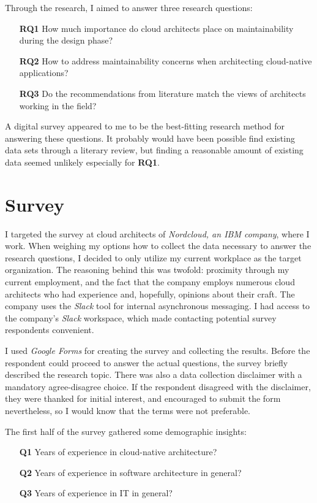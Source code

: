 \documentclass[utf8,english]{gradu3}
\begin{document}
Through the research, I aimed to answer three research questions:
\begin{itemize}
  \item [\textbf{RQ1}] How much importance do cloud architects place on
        maintainability during the design phase?
  \item [\textbf{RQ2}] How to address maintainability concerns when architecting
        cloud-native applications?
  \item [\textbf{RQ3}] Do the recommendations from literature match the views of
        architects working in the field?
\end{itemize}

A digital survey appeared to me to be the best-fitting research method for
answering these questions.  It probably would have been possible find existing
data sets through a literary review, but finding a reasonable amount of existing
data seemed unlikely especially for \textbf{RQ1}.

\section{Survey}

I targeted the survey at cloud architects of \textit{Nordcloud, an IBM company},
where I work.  When weighing my options how to collect the data necessary to
answer the research questions, I decided to only utilize my current workplace as
the target organization.  The reasoning behind this was twofold: proximity
through my current employment, and the fact that the company employs numerous
cloud architects who had experience and, hopefully, opinions about their craft.
The company uses the \textit{Slack} tool for internal asynchronous messaging.  I
had access to the company's \textit{Slack} workspace, which made contacting
potential survey respondents convenient.

I used \textit{Google Forms} for creating the survey and collecting the results.
Before the respondent could proceed to answer the actual questions, the survey
briefly described the research topic.  There was also a data collection
disclaimer with a mandatory agree-disagree choice.  If the respondent disagreed
with the disclaimer, they were thanked for initial interest, and encouraged to
submit the form nevertheless, so I would know that the terms were not
preferable.

The first half of the survey gathered some demographic insights:
\begin{enumerate}
  \item [\textbf{Q1}] Years of experience in cloud-native architecture?
  \item [\textbf{Q2}] Years of experience in software architecture in general?
  \item [\textbf{Q3}] Years of experience in IT in general?
\end{enumerate}
\end{document}
